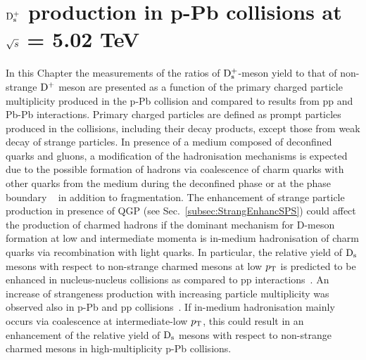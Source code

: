 \chapter{${\rm D_s^+}$ production in p-Pb collisions at $\sqrt{s}$ = 5.02 TeV}
\label{chap:chap6}

In this Chapter the measurements of the ratios of ${\rm D_s^+}$-meson yield to that of 
non-strange ${\rm D^+}$ meson are presented as a function of the primary
charged particle multiplicity produced in the p-Pb collision and compared to results from 
pp and Pb-Pb interactions. Primary charged particles are defined as prompt
particles produced in the collisions, including their decay products,
except those from weak decay of strange particles.
In presence of a medium 
composed of deconfined quarks and gluons, a modification of the hadronisation 
mechanisms is expected due to the possible formation of hadrons via
coalescence of charm quarks with other quarks from the 
medium during the deconfined phase or at the phase boundary
~\cite{Greco:2003mm,Greco:2003vf, Andronic:2007zu, He:2012df} in addition to
fragmentation. The enhancement of strange particle production in presence of QGP 
(see Sec.~\ref{subsec:StrangEnhancSPS}) could affect the production of charmed hadrons if 
the dominant mechanism for D-meson formation at low and 
intermediate momenta is in-medium hadronisation of charm quarks 
via recombination with light quarks. In particular, the relative yield of ${\rm D_s}$ 
mesons with respect to non-strange charmed mesons at low $p_{\rm T}$ is 
predicted to be enhanced in nucleus-nucleus collisions as compared to pp 
interactions~\cite{Andronic2003,RafelskiKuznetsova,HeFriesRapp}.
An increase of strangeness production with increasing particle multiplicity was observed 
also in p-Pb and pp collisions~\cite{Abelev:2013haa,Adam:2015vsf,ALICE:2017jyt}. 
If in-medium hadronisation mainly occurs via coalescence at intermediate-low $p_{\rm T}$, this could result in 
an enhancement of the relative yield of ${\rm D_s}$ mesons 
with respect to non-strange charmed mesons in high-multiplicity p-Pb collisions.\\

